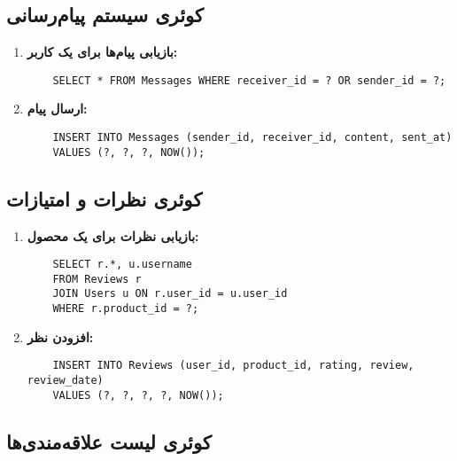 \documentclass[12pt]{article}
\begin{document}
\subsection{کوئری سیستم پیام‌رسانی}

\begin{enumerate}
    \item \textbf{بازیابی پیام‌ها برای یک کاربر:}
    \begin{latin}
    \begin{verbatim}
    SELECT * FROM Messages WHERE receiver_id = ? OR sender_id = ?;
    \end{verbatim}
    \end{latin}
    
    \item \textbf{ارسال پیام:}
    \begin{latin}
    \begin{verbatim}
    INSERT INTO Messages (sender_id, receiver_id, content, sent_at)
    VALUES (?, ?, ?, NOW());
    \end{verbatim}
    \end{latin}
\end{enumerate}

\subsection{کوئری نظرات و امتیازات}

\begin{enumerate}
    \item \textbf{بازیابی نظرات برای یک محصول:}
    \begin{latin}
    \begin{verbatim}
    SELECT r.*, u.username
    FROM Reviews r
    JOIN Users u ON r.user_id = u.user_id
    WHERE r.product_id = ?;
    \end{verbatim}
    \end{latin}
    
    \item \textbf{افزودن نظر:}
    \begin{latin}
    \begin{verbatim}
    INSERT INTO Reviews (user_id, product_id, rating, review, review_date)
    VALUES (?, ?, ?, ?, NOW());
    \end{verbatim}
    \end{latin}
\end{enumerate}

\subsection{کوئری لیست علاقه‌مندی‌ها}
\end{document}
